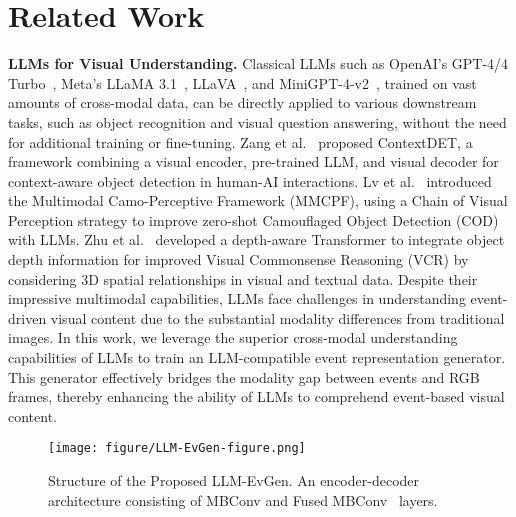\section{Related Work}
\noindent \textbf{LLMs for Visual Understanding.} Classical LLMs such as OpenAI's GPT-4/4 Turbo~\cite{openai2024gpt4}, Meta's LLaMA 3.1~\cite{dubey2024llama}, LLaVA~\cite{liu2024improved}, and MiniGPT-4-v2~\cite{chen2023minigptv2}, trained on vast amounts of cross-modal data, can be directly applied to various downstream tasks, such as object recognition and visual question answering, without the need for additional training or fine-tuning. Zang et al.~\cite{zang2024contextual} proposed ContextDET, a framework combining a visual encoder, pre-trained LLM, and visual decoder for context-aware object detection in human-AI interactions. Lv et al.~\cite{tang2024chain} introduced the Multimodal Camo-Perceptive Framework (MMCPF), using a Chain of Visual Perception strategy to improve zero-shot Camouflaged Object Detection (COD) with LLMs. Zhu et al.~\cite{zhu2024multi} developed a depth-aware Transformer to integrate object depth information for improved Visual Commonsense Reasoning (VCR) by considering 3D spatial relationships in visual and textual data.
Despite their impressive multimodal capabilities, LLMs face challenges in understanding event-driven visual content due to the substantial modality differences from traditional images. In this work, we leverage the superior cross-modal understanding capabilities of LLMs to train an LLM-compatible event representation generator. This generator effectively bridges the modality gap between events and RGB frames, thereby enhancing the ability of LLMs to comprehend event-based visual content.

\begin{figure}[t]
  \centering
  \texttt{[image: figure/LLM-EvGen-figure.png]}
  \caption{Structure of the Proposed LLM-EvGen. An encoder-decoder architecture consisting of MBConv and Fused MBConv~\cite{tan2021efficientnetv2} layers.}
  \label{fig:network framework}
\end{figure}

